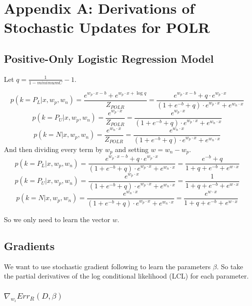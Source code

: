 \documentclass{article}
\begin{document}
 


\onecolumn

\section{Appendix A: Derivations of Stochastic Updates for POLR}

\subsection{Positive-Only Logistic Regression Model}

Let $q = \frac{1}{1 - minimumC} - 1$.

$$
p(k=P_L | x, w_p, w_n) =  \frac{e^{w_p \cdot x - b} + e^{w_p \cdot x + \log{q}}}{Z_{POLR}} 
				     = \frac{e^{w_p \cdot x - b} + q \cdot e^{w_p \cdot x}}{(1 + e^{-b} + q) \cdot e^{w_p \cdot x} + e^{w_n \cdot x}} 
$$
$$
p(k=P_U | x, w_p, w_n) =  \frac{e^{w_p \cdot x}}{Z_{POLR}} 
				     = \frac{e^{w_p \cdot x}}{(1 + e^{-b} + q) \cdot e^{w_p \cdot x} + e^{w_n \cdot x}} 
$$
$$
p(k=N | x, w_p, w_n) =  \frac{e^{w_n \cdot x}}{Z_{POLR}} 
				 = \frac{e^{w_n \cdot x}}{(1 + e^{-b} + q) \cdot e^{w_p \cdot x} + e^{w_n \cdot x}} 
$$
And then dividing every term by $w_p$ and setting $w = w_n - w_p$.
$$
p(k=P_L | x, w_p, w_n) = \frac{e^{w_p \cdot x - b} + q \cdot e^{w_p \cdot x}}{(1 + e^{-b} + q) \cdot e^{w_p \cdot x} + e^{w_n \cdot x}} 
 				     = \frac{e^{-b} + q}{1 + q + e^{-b} + e^{w \cdot x}}
$$
$$
p(k=P_U | x, w_p, w_n) = \frac{e^{w_p \cdot x}}{(1 + e^{-b} + q) \cdot e^{w_p \cdot x} + e^{w_n \cdot x}} 
				     = \frac{1}{1 + q + e^{-b} + e^{w \cdot x}}
$$
$$
p(k=N | x, w_p, w_n) = \frac{e^{w_n \cdot x}}{(1 + e^{-b} + q) \cdot e^{w_p \cdot x} + e^{w_n \cdot x}} 
				= \frac{e^{w \cdot x}}{1 + q + e^{-b} + e^{w \cdot x}}
$$


So we only need to learn the vector $w$.

\subsection{Gradients}

We want to use stochastic gradient following to learn the parameters $\beta$. So take the partial derivatives of the log conditional likelihood (LCL) for each parameter.

\subsubsection{$ \nabla_{w_i}{Err_R (D, \beta)}$}
\end{document}
